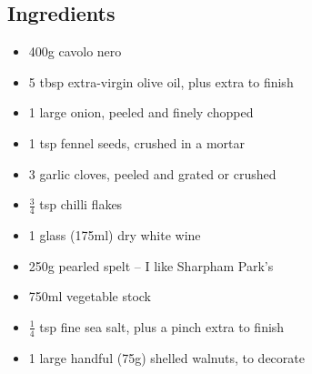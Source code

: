 \documentclass{book}
\begin{document}
\subsection*{Ingredients}
\begin{itemize}
\item 400g cavolo nero
\item 5 tbsp extra-virgin olive oil, plus extra to finish
\item 1 large onion, peeled and finely chopped
\item 1 tsp fennel seeds, crushed in a mortar
\item 3 garlic cloves, peeled and grated or crushed
\item $\frac{3}{4}$ tsp chilli flakes
\item 1 glass (175ml) dry white wine
\item 250g pearled spelt – I like Sharpham Park’s
\item 750ml vegetable stock
\item $\frac{1}{4}$ tsp fine sea salt, plus a pinch extra to finish
\item 1 large handful (75g) shelled walnuts, to decorate
\end{itemize}
\end{document}
